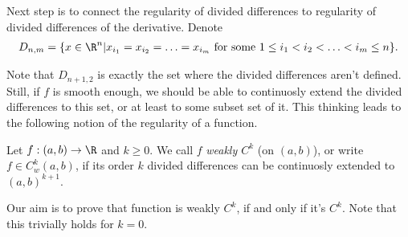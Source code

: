 Next step is to connect the regularity of divided differences to regularity of divided differences of the derivative. Denote
\begin{align*}
	D_{n, m} = \{x \in \R^{n} | x_{i_{1}} = x_{i_{2}} = \ldots = x_{i_{m}} \text{ for some $1 \leq i_{1} < i_{2} < \ldots < i_{m} \leq n$} \}.
\end{align*}

Note that $D_{n + 1, 2}$ is exactly the set where the divided differences aren't defined. Still, if $f$ is smooth enough, we should be able to continuosly extend the divided differences to this set, or at least to some subset set of it. This thinking leads to the following notion of the regularity of a function.

\begin{maar}
	Let $f : (a, b) \to \R$ and $k \geq 0$. We call $f$ \textit{weakly $C^{k}$} (on $(a, b)$), or write $f \in C_{w}^{k}(a, b)$, if its order $k$ divided differences can be continuosly extended to $(a, b)^{k + 1}$.
\end{maar}

Our aim is to prove that function is weakly $C^{k}$, if and only if it's $C^{k}$. Note that this trivially holds for $k = 0$.


